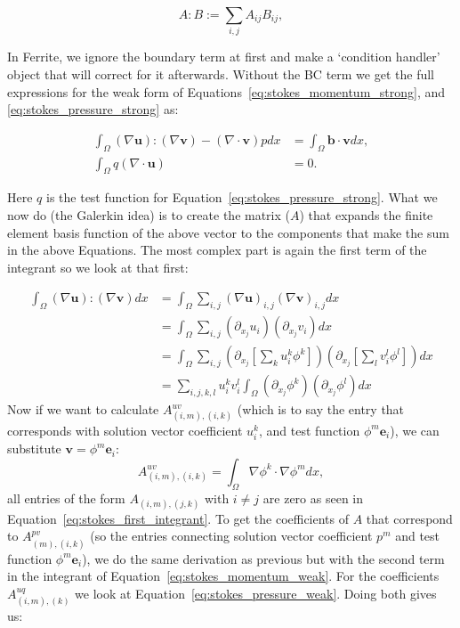 \documentclass{article}
\begin{document}
\begin{equation}\label{eq:Frobenius_inner_product}
    A:B :=\sum_{i,j}A_{ij}B_{ij},
\end{equation}

In Ferrite, we ignore the boundary term at first and make a `condition handler' object that will correct for it afterwards. Without the BC term we get the full expressions for the weak form of Equations~\ref{eq:stokes_momentum_strong}, and \ref{eq:stokes_pressure_strong} as:

\begin{align}
    \int_\Omega (\nabla\mathbf{u}):(\nabla\mathbf{v})-(\nabla \cdot \mathbf{v})p dx &= \int_{\Omega}\mathbf{b\cdot v}dx, \label{eq:stokes_momentum_weak}\\
    \int_\Omega q(\nabla\cdot\mathbf{u})&=0. \label{eq:stokes_pressure_weak}
\end{align}

Here $q$ is the test function for Equation~\ref{eq:stokes_pressure_strong}. What we now do (the Galerkin idea) is to create the matrix ($A$) that expands the finite element basis function of the above vector to the components that make the sum in the above Equations. The most complex part is again the first term of the integrant so we look at that first:

\begin{align}
    \int_\Omega (\nabla \mathbf{u}):(\nabla \mathbf{v})dx 
    &= \int_\Omega \sum_{i,j}(\nabla \mathbf{u})_{i,j}(\nabla \mathbf{v})_{i,j}dx\\
    &= \int_\Omega \sum_{i,j}(\partial_{x_j}u_i)(\partial_{x_j}v_i)dx \\
    &= \int_\Omega 
        \sum_{i,j}
            (\partial_{x_j}[\sum_k u_i^k\phi^k])
            (\partial_{x_j}[\sum_l v_i^l\phi^l])
        dx \\
    &= 
    \sum_{i,j,k,l}
        u_i^k v_i^l
        \int_\Omega 
            (\partial_{x_j}\phi^k)
            (\partial_{x_j}\phi^l)
        dx \label{eq:stokes_first_integrant}
\end{align}
Now if we want to calculate $A_{(i,m),(i,k)}^{uv}$ (which is to say the entry that corresponds with solution vector coefficient $u_i^k$, and test function $\phi^m\mathbf{e}_i$), we can substitute $\mathbf{v}=\phi^m\mathbf{e}_i$:
\begin{equation}
    A_{(i,m),(i,k)}^{uv} = \int_\Omega \nabla \phi^k\cdot\nabla\phi^m dx,
\end{equation}
all entries of the form $A_{(i,m),(j,k)}$ with $i\neq j$ are zero as seen in Equation~\ref{eq:stokes_first_integrant}. To get the coefficients of $A$ that correspond to $A_{(m),(i,k)}^{pv}$ (so the entries connecting solution vector coefficient $p^m$ and test function $\phi^m\mathbf{e}_i$), we do the same derivation as previous but with the second term in the integrant of Equation~\ref{eq:stokes_momentum_weak}. For the coefficients $A_{(i,m),(k)}^{uq}$ we look at Equation~\ref{eq:stokes_pressure_weak}. Doing both gives us:
\end{document}
